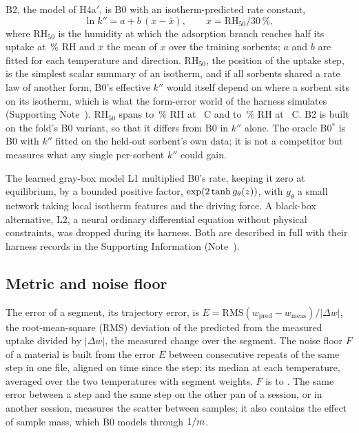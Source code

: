 \documentclass[12pt]{article}
\newcommand{\kpp}{k''}
\newcommand{\RHh}{\mathrm{RH}_{50}}
\begin{document}
B2, the model of H4a$'$, is B0 with an isotherm-predicted rate constant,
\begin{equation}
\ln \kpp = a + b\,(x - \bar{x}), \qquad x = \RHh / 30\,\%,
\end{equation}
where $\RHh$ is the humidity at which the adsorption branch reaches half its uptake at \,\% RH and
$\bar{x}$ the mean of $x$ over the training sorbents; $a$ and $b$ are fitted for each temperature and direction.
$\RHh$, the position of the uptake step, is the simplest scalar summary of an isotherm, and if all sorbents shared a
rate law of another form, B0's effective $\kpp$ would itself depend on where a sorbent sits on its isotherm, which is
what the form-error world of the harness simulates (Supporting Note~).
$\RHh$ spans  to \,\% RH at ~\textdegree C and
 to \,\% RH at ~\textdegree C. B2 is built on the fold's B0
variant, so that it differs from B0 in $\kpp$ alone. The oracle B0$^{*}$ is B0 with $\kpp$ fitted on
the held-out sorbent's own data; it is not a competitor but measures what any single per-sorbent $\kpp$ could gain.

The learned gray-box model L1 multiplied B0's rate, keeping it zero at equilibrium, by a bounded positive factor,
$\exp(2\tanh g_\theta(z))$, with $g_\theta$ a small network taking local isotherm features and the driving force.
A black-box alternative, L2, a neural ordinary differential equation without physical constraints, was dropped during
its harness. Both are described in full with their harness records in the Supporting Information (Note~).

\subsection{Metric and noise floor}\label{sec:metric}

The error of a segment, its trajectory error, is $E = \mathrm{RMS}(w_{\mathrm{pred}} - w_{\mathrm{meas}})/|\Delta w|$, the root-mean-square
(RMS) deviation of the predicted from the measured uptake divided by $|\Delta w|$, the measured change over the
segment. The noise floor $F$ of a material is built from the error $E$ between consecutive repeats of the same step
in one file, aligned on time since the step: its median at each temperature, averaged over the two temperatures with
segment weights. $F$ is  to . The same error between a step and the same step on
the other pan of a session, or in another session, measures the scatter between samples; it also contains the effect
of sample mass, which B0 models through $1/m$.
\end{document}

